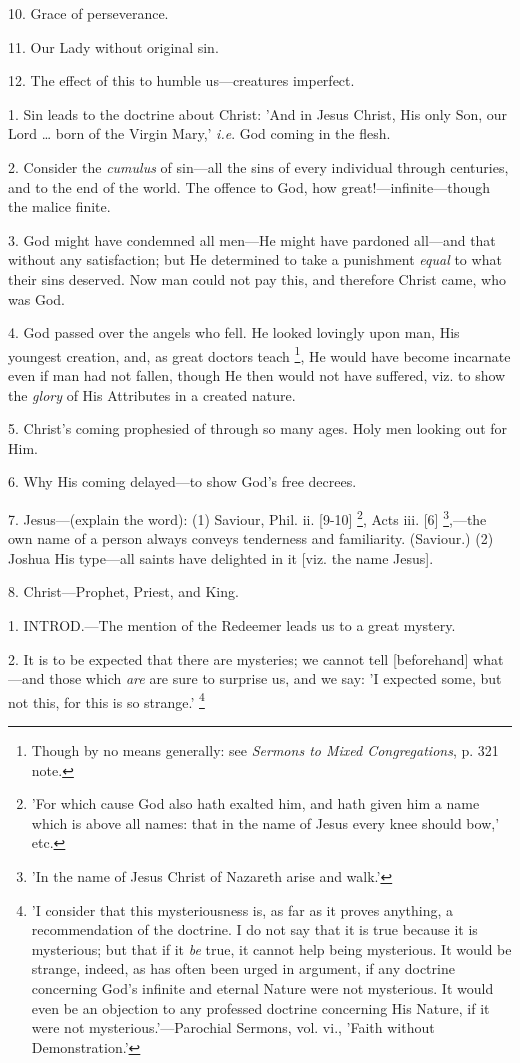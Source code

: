 10. Grace of perseverance.

11. Our Lady without original sin.

12. The effect of this to humble us—creatures
imperfect.


1. Sin leads to the doctrine about Christ: 'And
in Jesus Christ, His only Son, our Lord … born of the Virgin Mary,' \emph{i.e}.
God coming in the flesh.

2. Consider the \emph{cumulus} of sin—all the
sins of every individual through centuries, and to the end of the
world. The offence to God, how great!—infinite—though the malice
finite.

3. God might have condemned all men—He might
have pardoned all—and that without any satisfaction; but He
determined to take a punishment \emph{equal} to what their sins
deserved. Now man could not pay this, and therefore Christ came, who
was God.

4. God passed over the angels who fell. He looked
lovingly upon man, His youngest creation, and, as great doctors teach
\footnote{Though by no means
generally: see \emph{Sermons to Mixed Congregations}, p. 321 note.}, He would have become
incarnate even if man had not fallen, though He then would not
have suffered, viz. to show the \emph{glory} of His Attributes in a
created nature.

5. Christ's coming prophesied of through so many
ages. Holy men looking out for Him.

6. Why His coming delayed—to show God's free
decrees.

7. Jesus—(explain the word): (1) Saviour, Phil.
ii. [9-10] \footnote{'For which cause God
also hath exalted him, and hath given him a name which is above all
names: that in the name of Jesus every knee should bow,' etc.}, Acts iii.
[6] \footnote{'In the name of Jesus
Christ of Nazareth arise and walk.'},—the own name of
a person always conveys tenderness and familiarity. (Saviour.) (2)
Joshua His type—all saints have delighted in it [viz. the name
Jesus].

8. Christ—Prophet, Priest, and King.


1. INTROD.—The
mention of the Redeemer leads us to a great mystery.

2. It is to be expected that there are mysteries;
we cannot tell [beforehand] what—and those which \emph{are} are sure
to surprise us, and we say: 'I expected some, but not this, for this
is so strange.' \footnote{'I consider that this
mysteriousness is, as far as it proves anything, a recommendation of
the doctrine. I do not say that it is true because it is mysterious;
but that if it \emph{be} true, it cannot help being mysterious. It
would be strange, indeed, as has often been urged in argument, if any
doctrine concerning God's infinite and eternal Nature were not
mysterious. It would even be an objection to any professed doctrine
concerning His Nature, if it were not mysterious.'—Parochial
Sermons, vol. vi., 'Faith without Demonstration.'}

